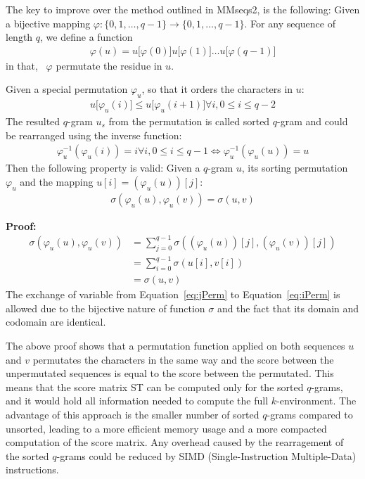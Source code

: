 \documentclass[twoside,a4paper,bsc]{master}
\newcommand{\Qgram}[1]{\(#1\)-gram}
\newcommand{\Subchar}[2]{#1\lbrack #2\rbrack}
\newcommand{\Permname}[1]{\varphi_{#1}}
\newcommand{\Perm}[2]{\Permname{#1}(#2)}
\newcommand{\Permnameinverse}[1]{\varphi_{#1}^{-1}}
\newcommand{\Perminverse}[2]{\Permnameinverse{#1}(#2)}
\newcommand{\Skiptheorem}{\smallskipamount}
\newcommand{\StartFormal}[1]{\par\addvspace{\Skiptheorem}\noindent\textbf{#1}}
\newcommand{\EndFormal}{\par\addvspace{\Skiptheorem}}
\newenvironment{Proof}{\StartFormal{Proof:}}{\EndFormal}
\begin{document}
The key to improve over the method outlined in MMseqs2, is the following:
Given a bijective mapping \(\varphi:\{0,1,\ldots,q-1\}\to
\{0,1,\ldots,q-1\}\). For any sequence of length \(q\), we define a
function
\begin{align}
\varphi(u)=\Subchar{u}{\varphi(0)}\Subchar{u}{\varphi(1)}\ldots\Subchar{u}{\varphi(q-1)}
\end{align}
in that, \ \(\varphi\) permutate the residue in \(u\).
\begin{Lemma}
\label{linearEncodingProof}
Given a special permutation \(\Permname{u}\), so that it orders the
characters in \(u\):
\begin{align}
\Subchar{u}{\Perm{u}{i}}\leq\Subchar{u}{\Perm{u}{i+1}}\forall i, 0\leq
i\leq q-2
\end{align}
The resulted \Qgram{q} \(u_s\) from the permutation is called sorted
\Qgram{q} and could be rearranged using the inverse function:
\begin{align}
\Perminverse{u}{\Perm{u}{i}}=i \forall i, 0\leq i\leq q-1 \Leftrightarrow
\Perminverse{u}{\Perm{u}{u}}=u
\end{align}
Then the following property is valid:
Given a \Qgram{q} \(u\), its sorting permutation \(\varphi_u\) and the
mapping \(u[i] = (\varphi_u (u))[j]\):
\begin{align}
\sigma(\Perm{u}{u},\Perm{u}{v}) = \sigma(u,v)
\end{align}
\begin{Proof}
\begin{align}
\sigma(\Perm{u}{u},\Perm{u}{v}) &= \sum_{j=0}^{q-1} \sigma ((\varphi_u
(u))[j], (\varphi_u (v))[j])\label{eq:jPerm}\\
&= \sum_{i=0}^{q-1} \sigma (u[i],v[i])\label{eq:iPerm} \\
&= \sigma(u,v)
\end{align}
The exchange of variable from Equation~\ref{eq:jPerm} to
Equation~\ref{eq:iPerm} is allowed due to the bijective nature of function
\(\sigma\) and the fact that its domain and codomain are identical.
\end{Proof}
\end{Lemma}
The above proof shows that a permutation function applied on both sequences
\(u\) and \(v\)
permutates the characters in the same way and the score between the
unpermutated sequences is equal to the score between the permutated. This
means that the score matrix ST can be computed only for the sorted
\Qgram{q}s, and it would hold all information needed to compute the full
$k$-environment.
The advantage of this approach is the smaller number of sorted \Qgram{q}s
compared to unsorted, leading to a more efficient memory usage and a more
compacted computation of the score matrix. Any overhead caused by the
rearragement of the sorted \Qgram{q}s could be reduced by SIMD
(Single-Instruction Multiple-Data) instructions.
\end{document}
